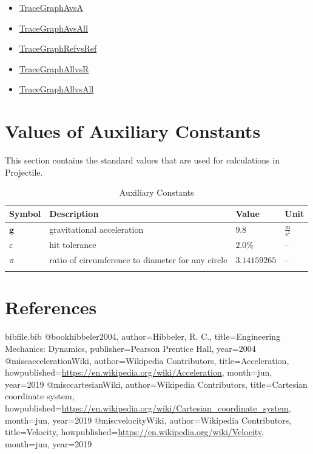 \documentclass[12pt]{article}
\begin{document}
\begin{itemize}
\item{\hyperref{../../../../traceygraphs/projectile/avsa.svg}{}{}{TraceGraphAvsA}}
\item{\hyperref{../../../../traceygraphs/projectile/avsall.svg}{}{}{TraceGraphAvsAll}}
\item{\hyperref{../../../../traceygraphs/projectile/refvsref.svg}{}{}{TraceGraphRefvsRef}}
\item{\hyperref{../../../../traceygraphs/projectile/allvsr.svg}{}{}{TraceGraphAllvsR}}
\item{\hyperref{../../../../traceygraphs/projectile/allvsall.svg}{}{}{TraceGraphAllvsAll}}
\end{itemize}
\section{Values of Auxiliary Constants}
\label{Sec:AuxConstants}
This section contains the standard values that are used for calculations in Projectile.

\begin{longtable}{l l l l}
\toprule
\textbf{Symbol} & \textbf{Description} & \textbf{Value} & \textbf{Unit}
\\
\midrule
\endhead
$\symbf{g}$ & gravitational acceleration & $9.8$ & $\frac{\text{m}}{\text{s}^{2}}$
\\
$ε$ & hit tolerance & $2.0\%$ & --
\\
$π$ & ratio of circumference to diameter for any circle & $3.14159265$ & --
\\
\bottomrule
\caption{Auxiliary Constants}
\label{Table:TAuxConsts}
\end{longtable}
\section{References}
\label{Sec:References}
\begin{filecontents*}{bibfile.bib}
@book{hibbeler2004,
author={Hibbeler, R. C.},
title={Engineering Mechanics: Dynamics},
publisher={Pearson Prentice Hall},
year={2004}}
@misc{accelerationWiki,
author={Wikipedia Contributors},
title={Acceleration},
howpublished={\url{https://en.wikipedia.org/wiki/Acceleration}},
month=jun,
year={2019}}
@misc{cartesianWiki,
author={Wikipedia Contributors},
title={Cartesian coordinate system},
howpublished={\url{https://en.wikipedia.org/wiki/Cartesian\_coordinate\_system}},
month=jun,
year={2019}}
@misc{velocityWiki,
author={Wikipedia Contributors},
title={Velocity},
howpublished={\url{https://en.wikipedia.org/wiki/Velocity}},
month=jun,
year={2019}}
\end{filecontents*}
\nocite{*}
\printbibliography[heading=none]
\end{document}

